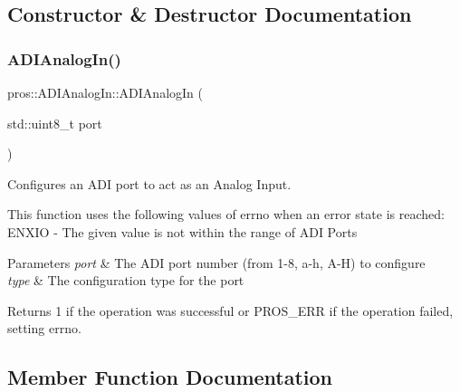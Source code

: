 \subsection{Constructor \& Destructor Documentation}
\mbox{\label{classpros_1_1ADIAnalogIn_aeac81958e7ba33ee9693ab843f5b55ed}} 
\subsubsection{\texorpdfstring{A\+D\+I\+Analog\+In()}{ADIAnalogIn()}}
{\footnotesize\ttfamily pros\+::\+A\+D\+I\+Analog\+In\+::\+A\+D\+I\+Analog\+In (\begin{DoxyParamCaption}\item[{std\+::uint8\+\_\+t}]{port }\end{DoxyParamCaption})}



Configures an A\+DI port to act as an Analog Input. 

This function uses the following values of errno when an error state is reached\+: E\+N\+X\+IO -\/ The given value is not within the range of A\+DI Ports


\begin{DoxyParams}{Parameters}
{\em port} & The A\+DI port number (from 1-\/8, \textquotesingle{}a\textquotesingle{}-\/\textquotesingle{}h\textquotesingle{}, \textquotesingle{}A\textquotesingle{}-\/\textquotesingle{}H\textquotesingle{}) to configure \\
\hline
{\em type} & The configuration type for the port\\
\hline
\end{DoxyParams}
\begin{DoxyReturn}{Returns}
1 if the operation was successful or P\+R\+O\+S\+\_\+\+E\+RR if the operation failed, setting errno. 
\end{DoxyReturn}


\subsection{Member Function Documentation}
\mbox{\label{classpros_1_1ADIAnalogIn_ac8dd1e625cbcec4951d20be0c0fa2d3c}} 
